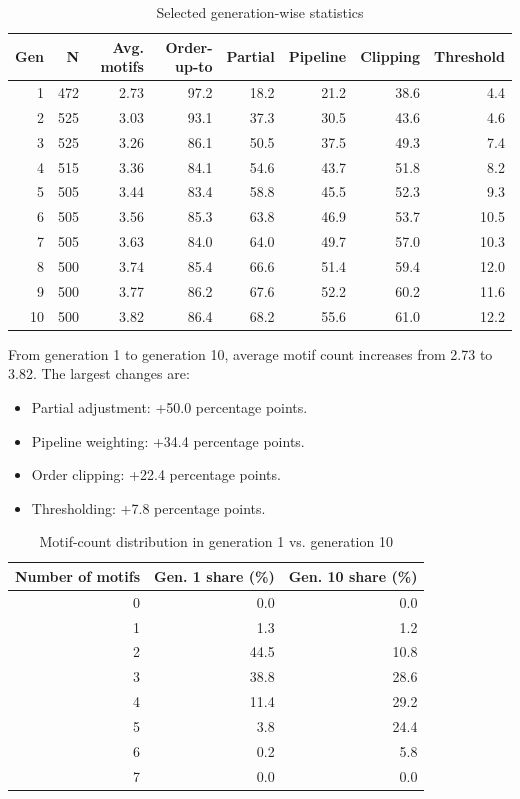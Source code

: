 \documentclass[11pt]{article}
\begin{document}
\begin{table}[H]
\centering
\caption{Selected generation-wise statistics}
\small
\begin{tabular}{rrrrrrrr}
\toprule
Gen & N & Avg. motifs & Order-up-to & Partial & Pipeline & Clipping & Threshold \\
\midrule
1 & 472 & 2.73 & 97.2 & 18.2 & 21.2 & 38.6 & 4.4 \\
2 & 525 & 3.03 & 93.1 & 37.3 & 30.5 & 43.6 & 4.6 \\
3 & 525 & 3.26 & 86.1 & 50.5 & 37.5 & 49.3 & 7.4 \\
4 & 515 & 3.36 & 84.1 & 54.6 & 43.7 & 51.8 & 8.2 \\
5 & 505 & 3.44 & 83.4 & 58.8 & 45.5 & 52.3 & 9.3 \\
6 & 505 & 3.56 & 85.3 & 63.8 & 46.9 & 53.7 & 10.5 \\
7 & 505 & 3.63 & 84.0 & 64.0 & 49.7 & 57.0 & 10.3 \\
8 & 500 & 3.74 & 85.4 & 66.6 & 51.4 & 59.4 & 12.0 \\
9 & 500 & 3.77 & 86.2 & 67.6 & 52.2 & 60.2 & 11.6 \\
10 & 500 & 3.82 & 86.4 & 68.2 & 55.6 & 61.0 & 12.2 \\
\bottomrule
\end{tabular}
\end{table}

From generation 1 to generation 10, average motif count increases from 2.73 to 3.82. The largest changes are:
\begin{itemize}
  \item Partial adjustment: +50.0 percentage points.
  \item Pipeline weighting: +34.4 percentage points.
  \item Order clipping: +22.4 percentage points.
  \item Thresholding: +7.8 percentage points.
\end{itemize}

\begin{table}[H]
\centering
\caption{Motif-count distribution in generation 1 vs. generation 10}
\begin{tabular}{rrr}
\toprule
Number of motifs & Gen. 1 share (\%) & Gen. 10 share (\%) \\
\midrule
0 & 0.0 & 0.0 \\
1 & 1.3 & 1.2 \\
2 & 44.5 & 10.8 \\
3 & 38.8 & 28.6 \\
4 & 11.4 & 29.2 \\
5 & 3.8 & 24.4 \\
6 & 0.2 & 5.8 \\
7 & 0.0 & 0.0 \\
\bottomrule
\end{tabular}
\end{table}
\end{document}
